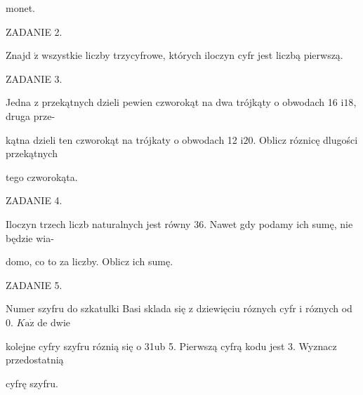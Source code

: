 \documentclass[a4paper,12pt]{article}
\begin{document}
monet.

ZADANIE 2.

Znajd $\acute{\mathrm{z}}$ wszystkie liczby trzycyfrowe, których iloczyn cyfr jest liczbą pierwszą.

ZADANIE 3.

Jedna z przekątnych dzieli pewien czworokąt na dwa trójkąty o obwodach 16 $\mathrm{i}18$, druga prze-

kątna dzieli ten czworokąt na trójkaty o obwodach 12 $\mathrm{i}20$. Oblicz róznicę dlugości przekątnych

tego czworokąta.

ZADANIE 4.

Iloczyn trzech liczb naturalnych jest równy 36. Nawet gdy podamy ich sumę, nie będzie wia-

domo, co to za liczby. Oblicz ich sumę.

ZADANIE 5.

Numer szyfru do szkatulki Basi sklada się z dziewięciu róznych cyfr i róznych od 0. $K\mathrm{a}\dot{\mathrm{z}}$ de dwie

kolejne cyfry szyfru róznią się o 31ub 5. Pierwszą cyfrą kodu jest 3. Wyznacz przedostatnią

cyfrę szyfru.
\end{document}
